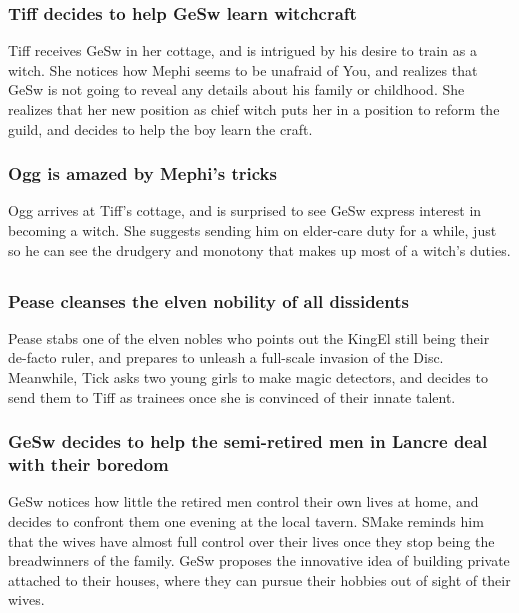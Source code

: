 \subsubsection{\Gls{Tiff} decides to help \Gls{GeSw} learn witchcraft}
\Gls{Tiff} receives \Gls{GeSw} in her cottage, and is intrigued by his desire to train as a witch.
She notices how \Gls{Mephi} seems to be unafraid of \Gls{You}, and realizes that \Gls{GeSw} is not
going to reveal any details about his family or childhood. She realizes that her new position as
chief witch puts her in a position to reform the guild, and decides to help the boy learn the
craft.

\subsubsection{\Gls{Ogg} is amazed by \Gls{Mephi}'s tricks}
\Gls{Ogg} arrives at \Gls{Tiff}'s cottage, and is surprised to see \Gls{GeSw} express interest in
becoming a witch. She suggests sending him on elder-care duty for a while, just so he can see the
drudgery and monotony that makes up most of a witch's duties.

\subsection{}
\subsubsection{\Gls{Pease} cleanses the elven nobility of all dissidents}
\Gls{Pease} stabs one of the elven nobles who points out the \Gls{KingEl} still being their
de-facto ruler, and prepares to unleash a full-scale invasion of the Disc. Meanwhile, \Gls{Tick}
asks two young girls to make magic detectors, and decides to send them to \Gls{Tiff} as trainees
once she is convinced of their innate talent.

\subsubsection{\Gls{GeSw} decides to help the semi-retired men in Lancre deal with their boredom}
\Gls{GeSw} notices how little the retired men control their own lives at home, and decides to
confront them one evening at the local tavern. \Gls{SMake} reminds him that the wives have almost
full control over their lives once they stop being the breadwinners of the family. \Gls{GeSw}
proposes the innovative idea of building private attached to their houses, where they can pursue
their hobbies out of sight of their wives.

